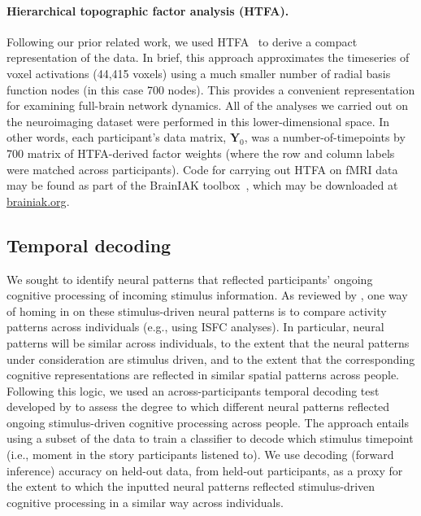 \documentclass[english]{article}
\begin{document}
\paragraph{Hierarchical topographic factor analysis (HTFA).}
Following our prior related work, we used HTFA~\citep{MannEtal18} to
derive a compact representation of the data.  In brief, this approach
approximates the timeseries of voxel activations (44,415 voxels) using
a much smaller number of radial basis function nodes (in this case 700
nodes).  This provides a convenient representation for examining
full-brain network dynamics.  All of the analyses we carried out on
the neuroimaging dataset were performed in this lower-dimensional
space.  In other words, each participant's data matrix,
$\mathbf{Y}_0$, was a number-of-timepoints by 700 matrix of
HTFA-derived factor weights (where the row and column labels were
matched across participants).  Code for carrying out HTFA on fMRI data
may be found as part of the BrainIAK toolbox~\citep{brainiak}, which
may be downloaded at \href{https://brainiak.org/}{brainiak.org}.

\subsection*{Temporal decoding}
We sought to identify neural patterns that reflected participants'
ongoing cognitive processing of incoming stimulus information.  As
reviewed by \cite{SimoEtal16}, one way of homing in on these
stimulus-driven neural patterns is to compare activity patterns across
individuals (e.g., using ISFC analyses).  In particular, neural
patterns will be similar across individuals, to the extent that the
neural patterns under consideration are stimulus driven, and to the
extent that the corresponding cognitive representations are reflected
in similar spatial patterns across people.  Following this logic, we
used an across-participants temporal decoding test developed by
\cite{MannEtal18} to assess the degree to which different neural
patterns reflected ongoing stimulus-driven cognitive processing across
people.  The approach entails using a subset of the data to train a
classifier to decode which stimulus timepoint (i.e., moment in the
story participants listened to).  We use decoding (forward inference)
accuracy on held-out data, from held-out participants, as a proxy for
the extent to which the inputted neural patterns reflected
stimulus-driven cognitive processing in a similar way across
individuals.
\end{document}
